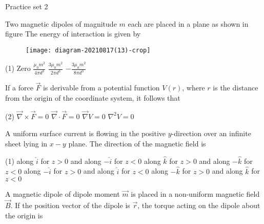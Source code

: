 \newpage
\begin{abox}
	Practice set 2
\end{abox}
\begin{enumerate}
\begin{minipage}{\textwidth}
	\item Two magnetic dipoles of magnitude $m$ each are placed in a plane as shown in figure The energy of interaction is given by
	\begin{figure}[H]
		\centering
		\texttt{[image: diagram-20210817(13)-crop]}
		\caption{}
		\label{}
	\end{figure}
\end{minipage}
\begin{tasks}(1)
	\task[\textbf{A.}] Zero
	\task[\textbf{B.}]$\frac{\mu_{0} m^{2}}{4 \pi d^{3}}$
	\task[\textbf{C.}]$\frac{3 \mu_{0} m^{2}}{2 \pi d^{3}}$
	\task[\textbf{D.}]$-\frac{3 \mu_{0} m^{2}}{8 \pi d^{3}}$
\end{tasks}
\begin{minipage}{\textwidth}
	\item If a force $\vec{F}$ is derivable from a potential function $V(r)$, where $r$ is the distance from the origin of the coordinate system, it follows that
\end{minipage}
\begin{tasks}(2)
	\task[\textbf{A.}]$\vec{\nabla} \times \vec{F}=0$
	\task[\textbf{B.}]$\vec{\nabla} \cdot \vec{F}=0$
	\task[\textbf{C.}]$\vec{\nabla} V=0$
	\task[\textbf{D.}]$\nabla^{2} V=0$
\end{tasks}
\begin{minipage}{\textwidth}
	\item A uniform surface current is flowing in the positive $y$-direction over an infinite sheet lying in $x-y$ plane. The direction of the magnetic field is
\end{minipage}
\begin{tasks}(1)
	\task[\textbf{A.}]along $\hat{i}$ for $z>0$ and along $-\hat{i}$ for $z<0$
	\task[\textbf{B.}]along $\hat{k}$ for $z>0$ and along $-\hat{k}$ for $z<0$
	\task[\textbf{C.}]along $-\hat{i}$ for $z>0$ and along $\hat{i}$ for $z<0$
	\task[\textbf{D.}]along $-\hat{k}$ for $z>0$ and along $\hat{k}$ for $z<0$
\end{tasks}
\begin{minipage}{\textwidth}
	\item A magnetic dipole of dipole moment $\vec{m}$ is placed in a non-uniform magnetic field $\vec{B} .$ If the position vector of the dipole is $\vec{r}$, the torque acting on the dipole about the origin is

\end{minipage}
\end{enumerate}
